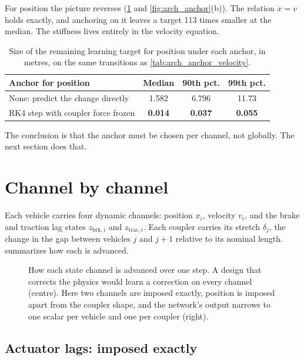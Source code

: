 For position the picture reverses (\cref{tab:arch_anchor_position} and \cref{fig:arch_anchor}(b)). The relation $\dot x = v$ holds exactly, and anchoring on it leaves a target 113 times smaller at the median. The stiffness lives entirely in the velocity equation.

\begin{table}[htbp]
    \centering
    \begin{tabular}{lccc}
        \toprule
        Anchor for position & Median & 90th pct. & 99th pct. \\
        \midrule
        None: predict the change directly    & 1.582 & 6.796 & 11.73 \\
        RK4 step with coupler force frozen    & \textbf{0.014} & \textbf{0.037} & \textbf{0.055} \\
        \bottomrule
    \end{tabular}
    \caption{Size of the remaining learning target for position under each anchor, in metres, on the same transitions as \cref{tab:arch_anchor_velocity}.}
    \label{tab:arch_anchor_position}
\end{table}

The conclusion is that the anchor must be chosen per channel, not globally. The next section does that.

\section{Channel by channel}
\label{sec:arch_channels}

Each vehicle carries four dynamic channels: position $x_i$, velocity $v_i$, and the brake and traction lag states $z_{\mathrm{brk},i}$ and $z_{\mathrm{trac},i}$. Each coupler carries its stretch $\delta_j$, the change in the gap between vehicles $j$ and $j+1$ relative to its nominal length.  summarizes how each is advanced.

\begin{figure}[htbp]
    \centering
    \resizebox{\textwidth}{!}{}
    \caption{How each state channel is advanced over one step. A design that corrects the physics would learn a correction on every channel (centre). Here two channels are imposed exactly, position is imposed apart from the coupler shape, and the network's output narrows to one scalar per vehicle and one per coupler (right).}
    \label{fig:arch_channels}
\end{figure}

\subsection{Actuator lags: imposed exactly}

